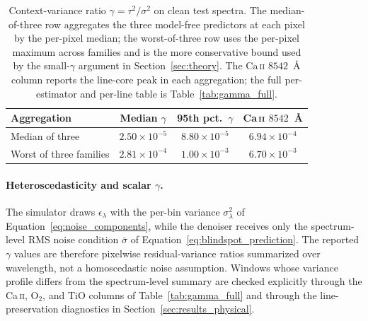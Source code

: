 \documentclass[twocolumn]{aastex7}
\begin{document}
\begin{table}[ht]
\centering
\small
\caption{Context-variance ratio $\gamma=\tau^2/\sigma^2$ on clean test spectra. The median-of-three row aggregates the three model-free predictors at each pixel by the per-pixel median; the worst-of-three row uses the per-pixel maximum across families and is the more conservative bound used by the small-$\gamma$ argument in Section~\ref{sec:theory}. The Ca\,\textsc{ii} $8542$~\AA{} column reports the line-core peak in each aggregation; the full per-estimator and per-line table is Table~\ref{tab:gamma_full}.}
\label{tab:gamma_main}
\begin{tabular}{lccc}
\hline
Aggregation & Median $\gamma$ & 95th pct.\ $\gamma$ & Ca\,\textsc{ii} $8542$~\AA{} \\
\hline
Median of three & $2.50\times10^{-5}$ & $8.80\times10^{-5}$ & $6.94\times10^{-4}$ \\
Worst of three families & $2.81\times10^{-4}$ & $1.00\times10^{-3}$ & $6.70\times10^{-3}$ \\
\hline
\end{tabular}
\end{table}

\paragraph{Heteroscedasticity and scalar $\gamma$.}
\label{app:gamma_heteroscedasticity}
The simulator draws $\epsilon_{\lambda}$ with the per-bin variance $\sigma_{\lambda}^{2}$ of Equation~\ref{eq:noise_components}, while the denoiser receives only the spectrum-level RMS noise condition $\bar{\sigma}$ of Equation~\ref{eq:blindspot_prediction}. The reported $\gamma$ values are therefore pixelwise residual-variance ratios summarized over wavelength, not a homoscedastic noise assumption. Windows whose variance profile differs from the spectrum-level summary are checked explicitly through the Ca\,\textsc{ii}, \mbox{O$_2$}, and TiO columns of Table~\ref{tab:gamma_full} and through the line-preservation diagnostics in Section~\ref{sec:results_physical}.
\end{document}
